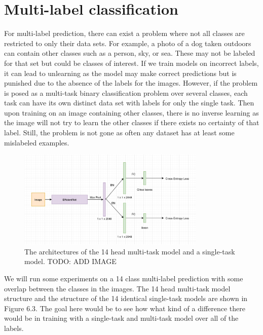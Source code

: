 \section{Multi-label classification}
For multi-label prediction, there can exist a problem where not all classes are restricted to only their data sets.
For example, a photo of a dog taken outdoors can contain other classes such as a person, sky, or sea.
These may not be labeled for that set but could be classes of interest.
If we train models on incorrect labels, it can lead to unlearning as the model may make correct predictions but is punished due to the absence of the labels for the images.
However, if the problem is posed as a multi-task binary classification problem over several classes, each task can have its own distinct data set with labels for only the single task.
Then upon training on an image containing other classes, there is no inverse learning as the image will not try to learn the other classes if there exists no certainty of that label.
Still, the problem is not gone as often any dataset has at least some mislabeled examples.

\begin{figure}[h!] 
\centering 
\includegraphics[width=0.8\textwidth]{imgs/object_classification_architecture.png}
\caption{The architectures of the 14 head multi-task model and a single-task model. TODO: ADD IMAGE}
\end{figure}

We will run some experiments on a 14 class multi-label prediction with some overlap between the classes in the images.
The 14 head multi-task model structure and the structure of the 14 identical single-task models are shown in Figure 6.3.
The goal here would be to see how what kind of a difference there would be in training with a single-task and multi-task model over all of the labels.

